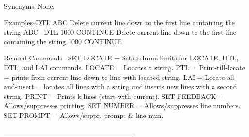  
Synonyms--None.
 
Examples--DTL ABC              Delete current line down
                               to the first line containing
                               the string     ABC
        --DTL 1000 CONTINUE    Delete current line down
                               to the first line containing
                               the string     1000 CONTINUE
 
Related Commands--
          SET LOCATE      = Sets column limits for
                            LOCATE, DTL, DTL, and
                            LAI commands.
          LOCATE          = Locates a string.
          PTL             = Print-till-locate =
                            prints from current line down
                            to line with located string.
          LAI             = Locate-all-and-insert =
                            locates all lines with a string
                            and inserts new lines with a second
                            string.
          PRINT           = Prints k lines (start with current).
          SET FEEDBACK    = Allows/suppresses printing.
          SET NUMBER      = Allows/suppresses line numbers.
          SET PROMPT      = Allows/suppr. prompt & line num.
 
----------------------------------------------------------
 
 
 
 
 
 
 
 
 
 
 
 
 
 
 
 
 
 
 
 
 
 
 
 
 
 
 
 
 
 
 
 
 
 
 
 
 
 
 
 
 
 
 
 
 
 
 
 
 
 
 
 
 
 
 

